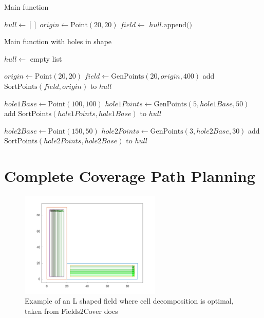 \documentclass[final]{cmpreport_02}
\begin{document}
\begin{algorithm}[h!]
	\caption{Main function}
	\label{mg:main}
	\begin{algorithmic}[1]
		\State $hull \gets []$
		\State $origin \gets \text{Point}(20, 20)$
		\State $field \gets$ 
		\State $hull.\text{append}($$)$
		\EndFunction
	\end{algorithmic}
\end{algorithm}

\begin{algorithm}[h!]
	\caption{Main function with holes in shape}
	\label{mg:mainWithHoles}
	\begin{algorithmic}[1]
		\State $hull \gets$ empty list

		\State $origin \gets \text{Point}(20, 20)$
		\State $field \gets \text{GenPoints}(20, origin, 400)$
		\State add $\text{SortPoints}(field, origin)$ to $hull$

		\State $hole1Base \gets \text{Point}(100, 100)$
		\State $hole1Points \gets \text{GenPoints}(5, hole1Base, 50)$
		\State add $\text{SortPoints}(hole1Points, hole1Base)$ to $hull$

		\State $hole2Base \gets \text{Point}(150, 50)$
		\State $hole2Points \gets \text{GenPoints}(3, hole2Base, 30)$
		\State add $\text{SortPoints}(hole2Points, hole2Base)$ to $hull$
		\EndProcedure
	\end{algorithmic}
\end{algorithm}

\clearpage
\section{Complete Coverage Path Planning}

\begin{figure}[h!]
	\centering
	\includegraphics[width=0.6\textwidth]{./images/f2cCellDecompL.png}
	\caption{Example of an L shaped field where cell decomposition is optimal, taken from Fields2Cover docs}
	\label{ccpp:cellDecomp}
\end{figure}
\end{document}
